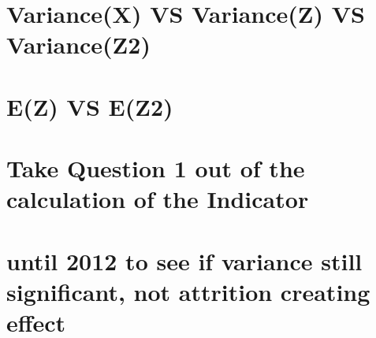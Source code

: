 \documentclass[12pt,a4paper,oneside]{book}
\begin{document}


\section{Variance(X) VS Variance(Z) VS Variance(Z2)}

\section{E(Z) VS E(Z2)}


\section{Take Question 1 out of the calculation of the Indicator}

\section{until 2012 to see if variance still significant, not attrition creating effect}
\end{document}
